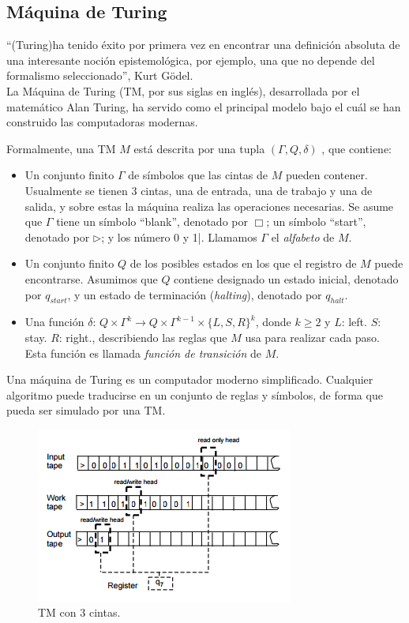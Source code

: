 \subsection{Máquina de Turing}

``(Turing)ha tenido éxito por primera vez en encontrar una definición absoluta de una interesante noción epistemológica, por ejemplo, una que no depende del formalismo seleccionado'', Kurt Gödel. \\

La Máquina de Turing (TM, por sus siglas en inglés), desarrollada por el matemático Alan Turing, ha servido como el principal modelo bajo el cuál se han construido las computadoras modernas.

\begin{defn}\end{defn}

Formalmente, una TM $M$ está descrita por una tupla $(\Gamma, Q, \delta)$  \cite{Arora2009}, que contiene:

\begin{itemize}
\item Un conjunto finito $\Gamma$ de símbolos que las cintas de $M$ pueden contener. Usualmente se tienen 3 cintas, una de entrada, una de trabajo y una de salida, y sobre estas la máquina realiza las operaciones necesarias. Se asume que $\Gamma$ tiene un símbolo ``blank'', denotado por $\Box$; un símbolo ``start'', denotado por $\rhd$; y los número 0 y 1|. Llamamos $\Gamma$ el \emph{alfabeto} de $M$.

\item Un conjunto finito $Q$ de los posibles estados en los que el registro de $M$ puede encontrarse. Asumimos que $Q$ contiene designado un estado inicial, denotado por $q_{start}$, y un estado de terminación (\emph{halting}), denotado por $q_{halt}$.

\item Una función $\delta$: $Q \times \Gamma^k \to Q \times \Gamma^{k-1} \times \{L,S,R\}^k$, donde $k \geq 2$ y $L$: left. $S$: stay. $R$: right., describiendo las reglas que $M$ usa para realizar cada paso. Esta función es llamada \emph{función de transición} de $M$. 
\end{itemize}

Una máquina de Turing es un computador moderno simplificado. Cualquier algoritmo puede traducirse en un conjunto de reglas y símbolos, de forma que pueda ser simulado por una TM.

\begin{figure}
	\centering
	\includegraphics{images/tm}
	\caption{TM con 3 cintas.}
\end{figure}

